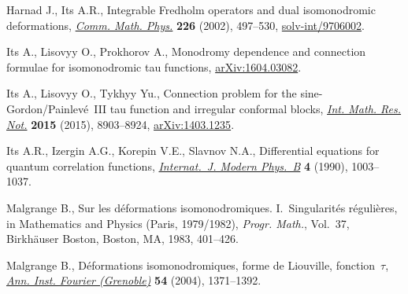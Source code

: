 \documentclass[pdftex]{sigma}
\numberwithin{equation}{section}
\begin{document}
\begin{thebibliography}{99}
Harnad J., Its A.R., Integrable {F}redholm operators and dual isomonodromic
 deformations, \href{https://doi.org/10.1007/s002200200614}{\textit{Comm. Math. Phys.}} \textbf{226} (2002), 497--530,
 \href{https://arxiv.org/abs/solv-int/9706002}{solv-int/9706002}.

Its A., Lisovyy O., Prokhorov A., Monodromy dependence and connection formulae
 for isomonodromic tau functions, \href{https://arxiv.org/abs/1604.03082}{arXiv:1604.03082}.

Its A., Lisovyy O., Tykhyy Yu., Connection problem for the
 sine-{G}ordon/{P}ainlev\'e~{III} tau function and irregular conformal blocks,
 \href{https://doi.org/10.1093/imrn/rnu209}{\textit{Int. Math. Res. Not.}} \textbf{2015} (2015), 8903--8924,
 \href{https://arxiv.org/abs/1403.1235}{arXiv:1403.1235}.

Its A.R., Izergin A.G., Korepin V.E., Slavnov N.A., Dif\/ferential equations for
 quantum correlation functions, \href{https://doi.org/10.1142/S0217979290000504}{\textit{Internat.~J. Modern Phys.~B}}
 \textbf{4} (1990), 1003--1037.

Malgrange B., Sur les d\'eformations isomonodromiques. {I}.~{S}ingularit\'es
 r\'eguli\`eres, in Mathematics and Physics ({P}aris, 1979/1982),
 \textit{Progr. Math.}, Vol.~37, Birkh\"auser Boston, Boston, MA, 1983,
 401--426.

Malgrange B., D\'eformations isomonodromiques, forme de {L}iouville,
 fonction~{$\tau$}, \href{https://doi.org/10.5802/aif.2052}{\textit{Ann. Inst. Fourier (Grenoble)}} \textbf{54} (2004),
 1371--1392.

\end{thebibliography}\LastPageEnding
\end{document}
